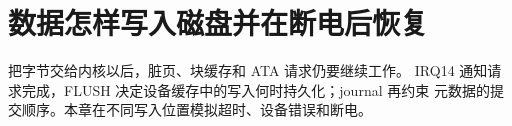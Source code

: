 \chapter{数据怎样写入磁盘并在断电后恢复}

 把字节交给内核以后，脏页、块缓存和 ATA 请求仍要继续工作。
IRQ14 通知请求完成，FLUSH 决定设备缓存中的写入何时持久化；journal 再约束
元数据的提交顺序。本章在不同写入位置模拟超时、设备错误和断电。








